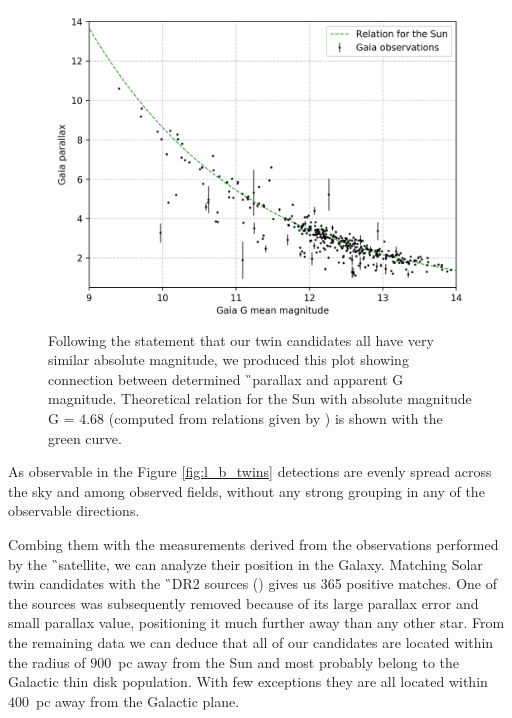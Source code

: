 \begin{figure}
	\centering
	\includegraphics[width=\columnwidth]{mag_parallax_gaia.png}
	\caption{Following the statement that our twin candidates all have very similar absolute magnitude, we produced this plot showing connection between determined \G\ parallax and apparent G magnitude. Theoretical relation for the Sun with absolute magnitude G = $4.68$ (computed from relations given by \protect\cite{2018arXiv180409368E}) is shown with the green curve.}
	\label{fig:mag_parallax}
\end{figure}

As observable in the Figure \ref{fig:l_b_twins} detections are evenly spread across the sky and among observed fields, without any strong grouping in any of the observable directions.

Combing them with the measurements derived from the observations performed by the \G\ satellite, we can analyze their position in the Galaxy. Matching Solar twin candidates with the \G\ DR2 sources (\cite{2018arXiv180409365G}) gives us 365 positive matches. One of the sources was subsequently removed because of its large parallax error and small parallax value, positioning it much further away than any other star. From the remaining data we can deduce that all of our candidates are located within the radius of $900$~pc away from the Sun and most probably belong to the Galactic thin disk population. With few exceptions they are all located within $400$~pc away from the Galactic plane.


